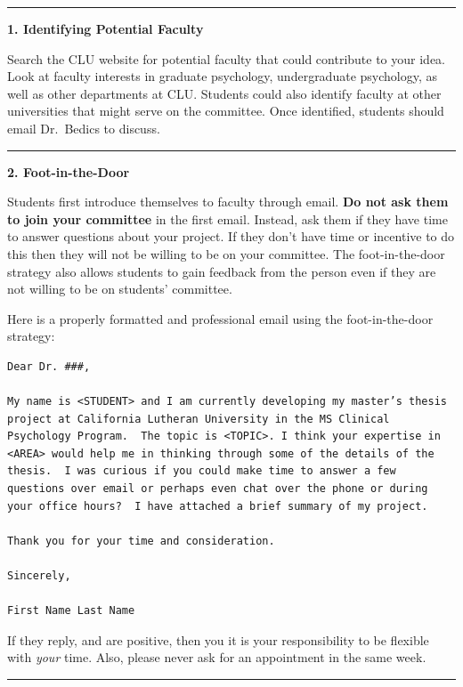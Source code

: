 \documentclass[openany]{book}
\begin{document}
\begin{center}\rule{0.5\linewidth}{0.5pt}\end{center}

\textbf{1. Identifying Potential Faculty}

Search the CLU website for potential faculty that could contribute to your idea. Look at faculty interests in graduate psychology, undergraduate psychology, as well as other departments at CLU. Students could also identify faculty at other universities that might serve on the committee. Once identified, students should email Dr.~Bedics to discuss.

\begin{center}\rule{0.5\linewidth}{0.5pt}\end{center}

\textbf{2. Foot-in-the-Door}

Students first introduce themselves to faculty through email. \textbf{Do not ask them to join your committee} in the first email. Instead, ask them if they have time to answer questions about your project. If they don't have time or incentive to do this then they will not be willing to be on your committee. The foot-in-the-door strategy also allows students to gain feedback from the person even if they are not willing to be on students' committee.

Here is a properly formatted and professional email using the foot-in-the-door strategy:

\begin{verbatim}
Dear Dr. ###,

My name is <STUDENT> and I am currently developing my master’s thesis project at California Lutheran University in the MS Clinical Psychology Program.  The topic is <TOPIC>. I think your expertise in <AREA> would help me in thinking through some of the details of the thesis.  I was curious if you could make time to answer a few questions over email or perhaps even chat over the phone or during your office hours?  I have attached a brief summary of my project.

Thank you for your time and consideration.

Sincerely,

First Name Last Name
\end{verbatim}

If they reply, and are positive, then you it is your responsibility to be flexible with \emph{your} time. Also, please never ask for an appointment in the same week.

\begin{center}\rule{0.5\linewidth}{0.5pt}\end{center}
\end{document}
